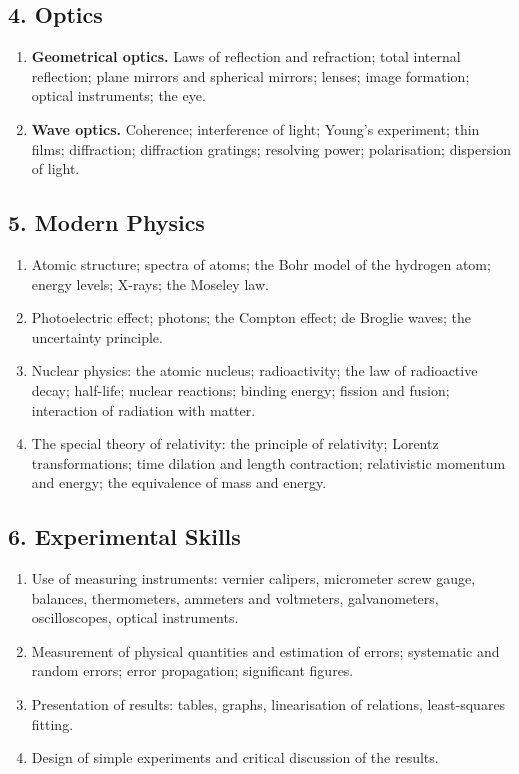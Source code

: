 \subsection*{4. Optics}

\begin{enumerate}[label=\arabic*.,leftmargin=2.2em,itemsep=1pt,topsep=2pt]
\item \textbf{Geometrical optics.} Laws of reflection and refraction; total internal reflection;
plane mirrors and spherical mirrors; lenses; image formation; optical instruments; the eye.
\item \textbf{Wave optics.} Coherence; interference of light; Young's experiment; thin films;
diffraction; diffraction gratings; resolving power; polarisation; dispersion of light.
\end{enumerate}

\subsection*{5. Modern Physics}

\begin{enumerate}[label=\arabic*.,leftmargin=2.2em,itemsep=1pt,topsep=2pt]
\item Atomic structure; spectra of atoms; the Bohr model of the hydrogen atom; energy levels;
X-rays; the Moseley law.
\item Photoelectric effect; photons; the Compton effect; de Broglie waves; the uncertainty
principle.
\item Nuclear physics: the atomic nucleus; radioactivity; the law of radioactive decay;
half-life; nuclear reactions; binding energy; fission and fusion; interaction of radiation with
matter.
\item The special theory of relativity: the principle of relativity; Lorentz transformations;
time dilation and length contraction; relativistic momentum and energy; the equivalence of mass
and energy.
\end{enumerate}

\subsection*{6. Experimental Skills}

\begin{enumerate}[label=\arabic*.,leftmargin=2.2em,itemsep=1pt,topsep=2pt]
\item Use of measuring instruments: vernier calipers, micrometer screw gauge, balances,
thermometers, ammeters and voltmeters, galvanometers, oscilloscopes, optical instruments.
\item Measurement of physical quantities and estimation of errors; systematic and random errors;
error propagation; significant figures.
\item Presentation of results: tables, graphs, linearisation of relations, least-squares fitting.
\item Design of simple experiments and critical discussion of the results.
\end{enumerate}
